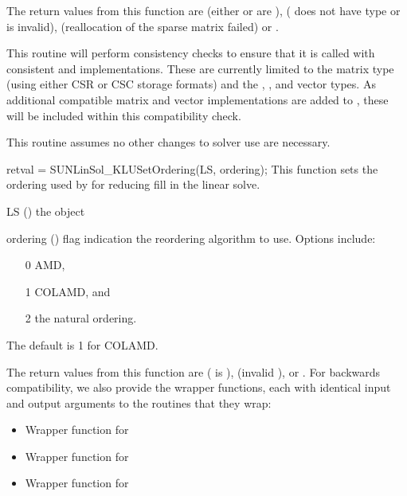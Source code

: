 {
  The return values from this function are 
  (either  or  are ), 
  ( does not have type  or
   is invalid),  (reallocation
  of the sparse matrix failed) or .
}
{
  This routine will perform consistency checks to ensure that it is
  called with consistent {\nvector} and {\sunmatrix} implementations.
  These are currently limited to the {\sunmatsparse} matrix type
  (using either CSR or CSC storage formats) and the {\nvecs},
  {\nvecopenmp}, and {\nvecpthreads} vector types.  As additional
  compatible matrix and vector implementations are added to
  {\sundials}, these will be included within this compatibility
  check.

  This routine assumes no other changes to solver use are necessary.
}
{
  retval = SUNLinSol\_KLUSetOrdering(LS, ordering);
}
{
  This function sets the ordering used by {\klu} for reducing fill in
  the linear solve.
}
{
  \begin{args}[ordering]
  \item[LS] ()
    the {\sunlinsolklu} object
  \item[ordering] ()
    flag indication the reordering algorithm to use.  Options include:
    \begin{itemize}
    \item[0] AMD,
    \item[1] COLAMD, and
    \item[2] the natural ordering.
    \end{itemize}
    The default is 1 for COLAMD.
  \end{args}
}
{
  The return values from this function are 
  ( is ), 
  (invalid ), or .
}
{
}
For backwards compatibility, we also provide the wrapper functions,
each with identical input and output arguments to the routines that
they wrap:
\begin{itemize}

\item {}

  Wrapper function for 

\item {}

  Wrapper function for 

\item {}

  Wrapper function for 

\end{itemize}
